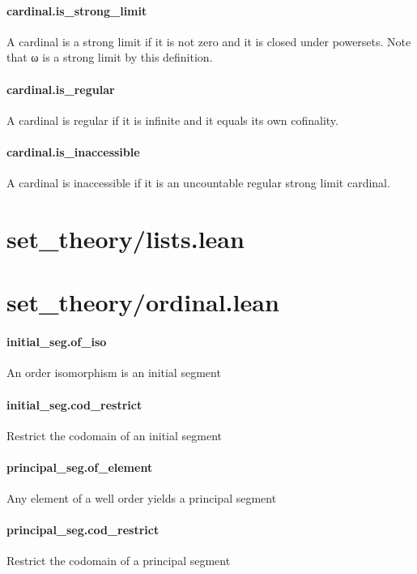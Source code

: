 \documentclass{article}
\begin{document}
\paragraph{cardinal.is\_strong\_limit}
\par
A cardinal is a strong limit if it is not zero and it is
closed under powersets. Note that 
\colorbox[RGB]{253,246,227}{{{{\color[RGB]{101, 123, 131} ω }}}} is a strong limit by this definition.
\paragraph{cardinal.is\_regular}
\par
A cardinal is regular if it is infinite and it equals its own cofinality.
\paragraph{cardinal.is\_inaccessible}
\par
A cardinal is inaccessible if it is an
uncountable regular strong limit cardinal.
\section{set\_theory/lists.lean}\section{set\_theory/ordinal.lean}\paragraph{initial\_seg.of\_iso}
\par
An order isomorphism is an initial segment
\paragraph{initial\_seg.cod\_restrict}
\par
Restrict the codomain of an initial segment
\paragraph{principal\_seg.of\_element}
\par
Any element of a well order yields a principal segment
\paragraph{principal\_seg.cod\_restrict}
\par
Restrict the codomain of a principal segment
\end{document}
